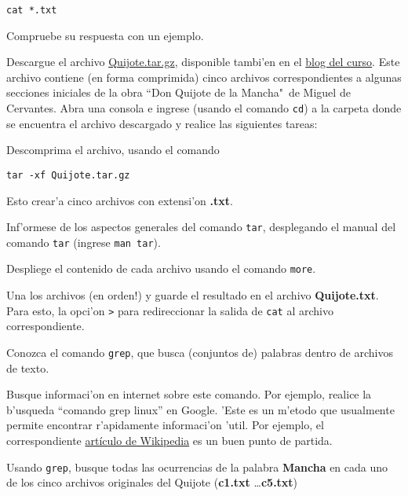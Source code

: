 \documentclass[11pt]{exam}
\begin{document}
\begin{questions}
\begin{parts}
\begin{verbatim}
cat *.txt
\end{verbatim}

Compruebe su respuesta con un ejemplo.
\end{parts}

\item Descargue el archivo \href{https://github.com/gfrubi/CC/raw/master/guias/01/Quijote.tar.gz}{Quijote.tar.gz}, disponible tambi'en en el \href{http://cc-cfm.blogspot.com}{blog del curso}. Este archivo contiene (en forma comprimida) cinco archivos correspondientes a algunas secciones iniciales de la obra ``Don Quijote de la Mancha"\, de Miguel de Cervantes. Abra una consola e ingrese (usando el comando \texttt{cd}) a la carpeta donde se encuentra el archivo descargado y realice las siguientes tareas:
\begin{parts}
\item Descomprima el archivo, usando el comando 

\begin{verbatim}
tar -xf Quijote.tar.gz
\end{verbatim}

Esto crear'a cinco archivos con extensi'on \textbf{.txt}. 
\item Inf'ormese de los aspectos generales del comando \texttt{tar}, desplegando el manual del comando \texttt{tar} (ingrese \texttt{man tar}).
\item Despliege el contenido de cada archivo usando el comando \texttt{more}.
\item Una los archivos (en orden!) y guarde el resultado en el archivo \textbf{Quijote.txt}. Para esto, la opci'on \texttt{>} para redireccionar la salida de \texttt{cat} al archivo correspondiente.
\end{parts}

\item Conozca el comando \texttt{grep}, que busca (conjuntos de) palabras dentro de archivos de texto. 
\begin{parts}
\item Busque informaci'on en internet sobre este comando. Por ejemplo, realice la b'usqueda ``comando grep linux'' en Google. 'Este es un m'etodo que usualmente permite encontrar r'apidamente informaci'on 'util. Por ejemplo, el correspondiente \href{https://es.wikipedia.org/wiki/Grep}{art\'iculo de Wikipedia} es un buen punto de partida.

\item Usando \texttt{grep}, busque todas las ocurrencias de la palabra \textbf{Mancha} en cada uno de los cinco archivos originales del Quijote (\textbf{c1.txt} \dots \textbf{c5.txt})


\end{parts}
\end{questions}
\end{document}
